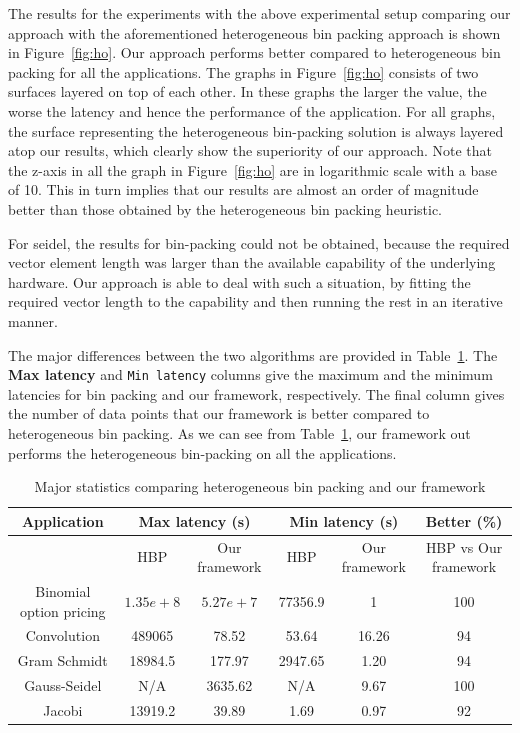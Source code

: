 The results for the experiments with the above experimental setup
comparing our approach with the aforementioned heterogeneous bin packing
approach is shown in Figure~\ref{fig:ho}. Our approach performs better
compared to heterogeneous bin packing for all the applications. The
graphs in Figure~\ref{fig:ho} consists of two surfaces layered on top of
each other. In these graphs the larger the value, the worse the latency
and hence the performance of the application. For all graphs, the
surface representing the heterogeneous bin-packing solution is always
layered atop our results, which clearly show the superiority of our
approach. Note that the z-axis in all the graph in Figure~\ref{fig:ho}
are in logarithmic scale with a base of 10. This in turn implies that
our results are almost an order of magnitude better than those obtained
by the heterogeneous bin packing heuristic.

For seidel, the results for bin-packing could not be obtained, because
the required vector element length was larger than the available
capability of the underlying hardware. Our approach is able to deal with
such a situation, by fitting the required vector length to the
capability and then running the rest in an iterative manner.

The major differences between the two algorithms are provided in
Table~\ref{tab:2}. The \textbf{Max latency} and \texttt{Min latency}
columns give the maximum and the minimum latencies for bin packing and
our framework, respectively. The final column gives the number of data
points that our framework is better compared to heterogeneous bin
packing. As we can see from Table~\ref{tab:2}, our framework out
performs the heterogeneous bin-packing on all the applications.

\begin{table}[t!]
  \centering
  \begin{tabular}{|c|c|c|c|c|c|}
    \hline
    \textbf{Application} &
    \multicolumn{2}{|c|}{\textbf{Max latency (s)}} &
    \multicolumn{2}{|c|}{\textbf{Min latency (s)}} &
    \textbf{Better (\%)} \\
    \hline
    & {HBP} & {Our framework} &
    {HBP} & {Our framework} & HBP vs Our framework\\
    \hline
    Binomial option pricing & $1.35e+8$ & $5.27e+7$ & 77356.9 & 1 & 100 \\
    \hline
    Convolution & 489065 & 78.52 & 53.64 & 16.26 & 94\\
    \hline
    Gram Schmidt & 18984.5 & 177.97 & 2947.65 & 1.20 & 94\\
    \hline
    Gauss-Seidel & N/A & 3635.62 & N/A & 9.67 & 100\\
    \hline
    Jacobi & 13919.2 & 39.89 & 1.69 & 0.97 & 92\\
    \hline
  \end{tabular}
  \caption{Major statistics comparing heterogeneous bin packing and our framework}
  \label{tab:2}
\end{table}

